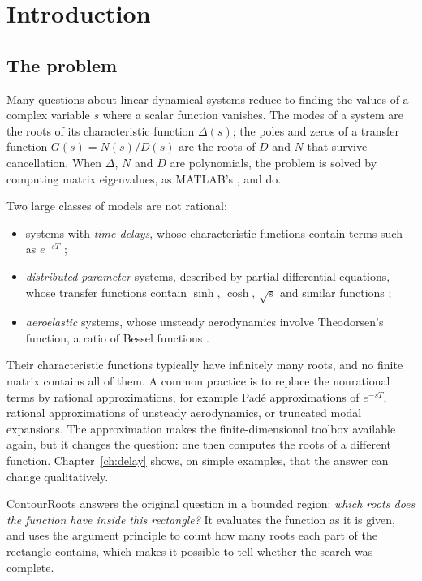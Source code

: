 \chapter{Introduction}\label{ch:intro}

\section{The problem}

Many questions about linear dynamical systems reduce to finding the
values of a complex variable $s$ where a scalar function vanishes. The
modes of a system are the roots of its characteristic function $\Delta(s)$;
the poles and zeros of a transfer function $G(s)=N(s)/D(s)$ are the roots
of $D$ and $N$ that survive cancellation. When $\Delta$, $N$ and $D$ are
polynomials, the problem is solved by computing matrix eigenvalues, as
MATLAB's ,  and  do.

Two large classes of models are not rational:
\begin{itemize}
  \item systems with \emph{time delays}, whose characteristic functions
        contain terms such as $e^{-sT}$ \citep{bellman1963,hale1993,gu2003,michiels2014};
  \item \emph{distributed-parameter} systems, described by partial
        differential equations, whose transfer functions contain
        $\sinh$, $\cosh$, $\sqrt s$ and similar functions
        \citep{curtain2009};
  \item \emph{aeroelastic} systems, whose unsteady aerodynamics involve
        Theodorsen's function, a ratio of Bessel functions
        \citep{edwards1977}.
\end{itemize}
Their characteristic functions typically have infinitely many roots, and
no finite matrix contains all of them. A common practice is to replace the
nonrational terms by rational approximations, for example Padé
approximations of $e^{-sT}$, rational approximations of unsteady
aerodynamics, or truncated modal expansions. The
approximation makes the finite-dimensional toolbox available again, but
it changes the question: one then computes the roots of a different
function. Chapter~\ref{ch:delay} shows, on simple examples, that the
answer can change qualitatively.

ContourRoots answers the original question in a bounded region: \emph{which
roots does the function have inside this rectangle?} It evaluates the
function as it is given, and uses the argument principle to count how many
roots each part of the rectangle contains, which makes it possible to tell
whether the search was complete.

